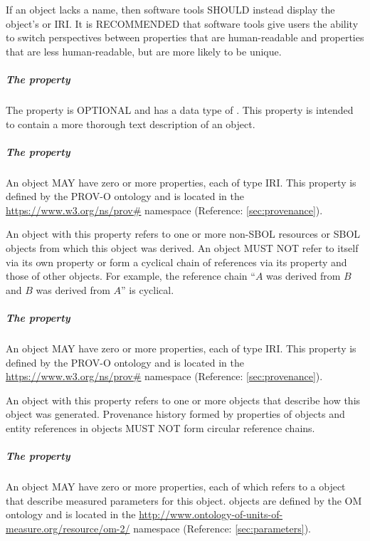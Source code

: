 If an  object lacks a name, then software tools SHOULD instead display the object's  or IRI.
It is RECOMMENDED that software tools give users the ability to switch perspectives between  properties that are human-readable and  properties that are less human-readable, but are more likely to be unique.

\subparagraph{The  property}
\label{sec:description}

The  property is OPTIONAL and has a data type of . This property is intended to contain a more thorough text description of an  object.

\subparagraph{The  property}
\label{sec:prov:wasDerivedFrom}
An  object MAY have zero or more  properties, each of type IRI. This property is defined by the PROV-O ontology and is located in the \url{https://www.w3.org/ns/prov#} namespace (Reference: \ref{sec:provenance}).

An  object with this property refers to one or more non-SBOL resources or SBOL  objects from which this object was derived. 
 An  object MUST NOT refer to itself via its own  property or form a cyclical chain of references via its  property and those of other  objects. For example, the reference chain ``$A$ was derived from $B$ and $B$ was derived from $A$'' is cyclical.

\subparagraph{The  property}
\label{sec:prov:wasGeneratedBy}
An  object MAY have zero or more  properties, each of type IRI. This property is defined by the PROV-O ontology and is located in the \url{https://www.w3.org/ns/prov#} namespace (Reference: \ref{sec:provenance}).

An  object with this property refers to one or more  objects that describe how this object was generated.
Provenance history formed by  properties of  objects and entity references in  objects MUST NOT form circular reference chains.

\subparagraph{The  property}
\label{sec:hasMeasure}
An  object MAY have zero or more  properties, each of which refers to a  object that describe measured parameters for this object.   objects are defined by the OM ontology and is located in the \url{http://www.ontology-of-units-of-measure.org/resource/om-2/} namespace (Reference: \ref{sec:parameters}).

